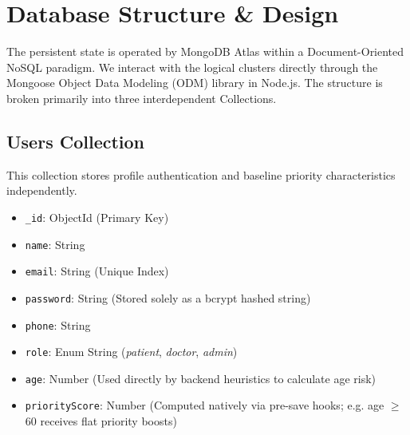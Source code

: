 \documentclass[12pt,a4paper]{article}
\begin{document}
\section{Database Structure \& Design}

The persistent state is operated by MongoDB Atlas within a Document-Oriented NoSQL paradigm. We interact with the logical clusters directly through the Mongoose Object Data Modeling (ODM) library in Node.js. The structure is broken primarily into three interdependent Collections.

\subsection{Users Collection}
This collection stores profile authentication and baseline priority characteristics independently.
\begin{itemize}
    \item \texttt{\_id}: ObjectId (Primary Key)
    \item \texttt{name}: String
    \item \texttt{email}: String (Unique Index)
    \item \texttt{password}: String (Stored solely as a bcrypt hashed string)
    \item \texttt{phone}: String
    \item \texttt{role}: Enum String (\textit{patient}, \textit{doctor}, \textit{admin})
    \item \texttt{age}: Number (Used directly by backend heuristics to calculate age risk)
    \item \texttt{priorityScore}: Number (Computed natively via pre-save hooks; e.g. age $\geq$ 60 receives flat priority boosts)
\end{itemize}
\end{document}
